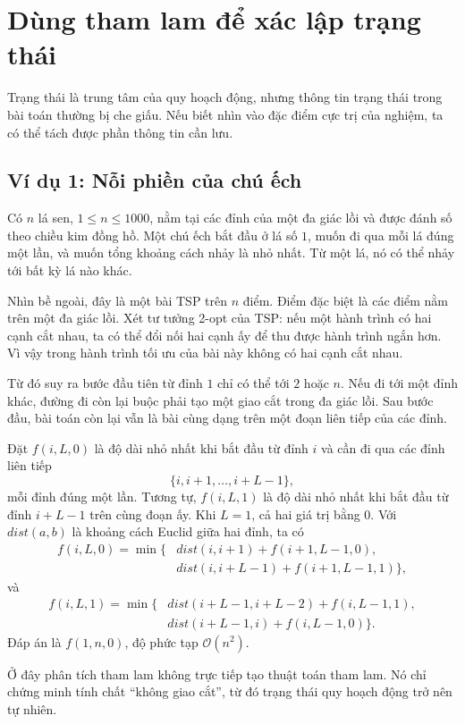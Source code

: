 \documentclass[11pt]{article}
\newcommand{\Oh}{\mathcal{O}}
\begin{document}
\section{Dùng tham lam để xác lập trạng thái}

Trạng thái là trung tâm của quy hoạch động, nhưng thông tin trạng thái trong
bài toán thường bị che giấu. Nếu biết nhìn vào đặc điểm cực trị của nghiệm, ta
có thể tách được phần thông tin cần lưu.

\subsection{Ví dụ 1: Nỗi phiền của chú ếch}

Có \(n\) lá sen, \(1\le n\le 1000\), nằm tại các đỉnh của một đa giác lồi và
được đánh số theo chiều kim đồng hồ. Một chú ếch bắt đầu ở lá số \(1\), muốn
đi qua mỗi lá đúng một lần, và muốn tổng khoảng cách nhảy là nhỏ nhất. Từ một
lá, nó có thể nhảy tới bất kỳ lá nào khác.

Nhìn bề ngoài, đây là một bài TSP trên \(n\) điểm. Điểm đặc biệt là các điểm
nằm trên một đa giác lồi. Xét tư tưởng 2-opt của TSP: nếu một hành trình có
hai cạnh cắt nhau, ta có thể đổi nối hai cạnh ấy để thu được hành trình ngắn
hơn. Vì vậy trong hành trình tối ưu của bài này không có hai cạnh cắt nhau.

Từ đó suy ra bước đầu tiên từ đỉnh \(1\) chỉ có thể tới \(2\) hoặc \(n\). Nếu
đi tới một đỉnh khác, đường đi còn lại buộc phải tạo một giao cắt trong đa
giác lồi. Sau bước đầu, bài toán còn lại vẫn là bài cùng dạng trên một đoạn
liên tiếp của các đỉnh.

Đặt \(f(i,L,0)\) là độ dài nhỏ nhất khi bắt đầu từ đỉnh \(i\) và cần đi qua
các đỉnh liên tiếp
\[
  \{i,i+1,\ldots,i+L-1\},
\]
mỗi đỉnh đúng một lần. Tương tự, \(f(i,L,1)\) là độ dài nhỏ nhất khi bắt đầu
từ đỉnh \(i+L-1\) trên cùng đoạn ấy. Khi \(L=1\), cả hai giá trị bằng \(0\).
Với \(dist(a,b)\) là khoảng cách Euclid giữa hai đỉnh, ta có
\[
\begin{aligned}
f(i,L,0)=\min\{&
dist(i,i+1)+f(i+1,L-1,0),\\
&dist(i,i+L-1)+f(i+1,L-1,1)\},
\end{aligned}
\]
và
\[
\begin{aligned}
f(i,L,1)=\min\{&
dist(i+L-1,i+L-2)+f(i,L-1,1),\\
&dist(i+L-1,i)+f(i,L-1,0)\}.
\end{aligned}
\]
Đáp án là \(f(1,n,0)\), độ phức tạp \(\Oh(n^2)\).

Ở đây phân tích tham lam không trực tiếp tạo thuật toán tham lam. Nó chỉ chứng
minh tính chất ``không giao cắt'', từ đó trạng thái quy hoạch động trở nên tự
nhiên.
\end{document}
